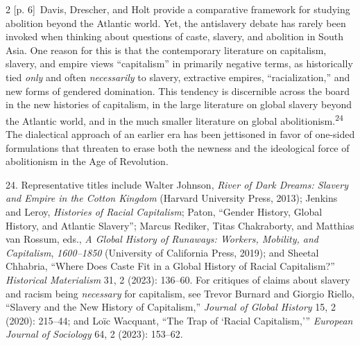 \documentclass[10pt,a4paper]{article}
\begin{document}
\begin{paracol}{2}
{\scriptsize\color{gray} [p. 6]}\ Davis, Drescher, and Holt provide a comparative framework for studying abolition beyond the Atlantic world. Yet, the antislavery debate has rarely been invoked when thinking about questions of caste, slavery, and abolition in South Asia. One reason for this is that the contemporary literature on capitalism, slavery, and empire views “capitalism” in primarily negative terms, as historically tied \textit{only} and often \textit{necessarily} to slavery, extractive empires, “racialization,” and new forms of gendered domination. This tendency is discernible across the board in the new histories of capitalism, in the large literature on global slavery beyond the Atlantic world, and in the much smaller literature on global abolitionism.\nobreak\textsuperscript{24} The dialectical approach of an earlier era has been jettisoned in favor of one-sided formulations that threaten to erase both the newness and the ideological force of abolitionism in the Age of Revolution.\par{\small 24. Representative titles include Walter Johnson, \textit{River of Dark Dreams: Slavery and Empire in the Cotton Kingdom} (Harvard University Press, 2013); Jenkins and Leroy, \textit{Histories of Racial Capitalism}; Paton, “Gender History, Global History, and Atlantic Slavery”; Marcus Rediker, Titas Chakraborty, and Matthias van Rossum, eds., \textit{A Global History of Runaways: Workers, Mobility, and Capitalism}, \textit{1600–1850} (University of California Press, 2019); and Sheetal Chhabria, “Where Does Caste Fit in a Global History of Racial Capitalism?” \textit{Historical Materialism} 31, 2 (2023): 136–60. For critiques of claims about slavery and racism being \textit{necessary} for capitalism, see Trevor Burnard and Giorgio Riello, “Slavery and the New History of Capitalism,” \textit{Journal of Global History} 15, 2 (2020): 215–44; and Loïc Wacquant, “The Trap of ‘Racial Capitalism,’” \textit{European Journal of Sociology} 64, 2 (2023): 153–62.\par}
\switchcolumn*

\end{paracol}
\end{document}
